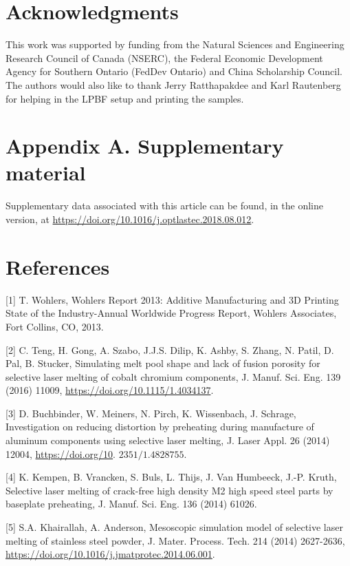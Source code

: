\documentclass[10pt]{article}
\begin{document}
\section*{Acknowledgments}
This work was supported by funding from the Natural Sciences and Engineering Research Council of Canada (NSERC), the Federal Economic Development Agency for Southern Ontario (FedDev Ontario) and China Scholarship Council. The authors would also like to thank Jerry Ratthapakdee and Karl Rautenberg for helping in the LPBF setup and printing the samples.

\section*{Appendix A. Supplementary material}
Supplementary data associated with this article can be found, in the online version, at \href{https://doi.org/10.1016/j.optlastec.2018.08.012}{https://doi.org/10.1016/j.optlastec.2018.08.012}.

\section*{References}
[1] T. Wohlers, Wohlers Report 2013: Additive Manufacturing and 3D Printing State of the Industry-Annual Worldwide Progress Report, Wohlers Associates, Fort Collins, CO, 2013.

[2] C. Teng, H. Gong, A. Szabo, J.J.S. Dilip, K. Ashby, S. Zhang, N. Patil, D. Pal, B. Stucker, Simulating melt pool shape and lack of fusion porosity for selective laser melting of cobalt chromium components, J. Manuf. Sci. Eng. 139 (2016) 11009, \href{https://doi.org/10.1115/1.4034137}{https://doi.org/10.1115/1.4034137}.

[3] D. Buchbinder, W. Meiners, N. Pirch, K. Wissenbach, J. Schrage, Investigation on reducing distortion by preheating during manufacture of aluminum components using selective laser melting, J. Laser Appl. 26 (2014) 12004, \href{https://doi.org/10}{https://doi.org/10}. $2351 / 1.4828755$.

[4] K. Kempen, B. Vrancken, S. Buls, L. Thijs, J. Van Humbeeck, J.-P. Kruth, Selective laser melting of crack-free high density M2 high speed steel parts by baseplate preheating, J. Manuf. Sci. Eng. 136 (2014) 61026.

[5] S.A. Khairallah, A. Anderson, Mesoscopic simulation model of selective laser melting of stainless steel powder, J. Mater. Process. Tech. 214 (2014) 2627-2636, \href{https://doi.org/10.1016/j.jmatprotec.2014.06.001}{https://doi.org/10.1016/j.jmatprotec.2014.06.001}.
\end{document}
